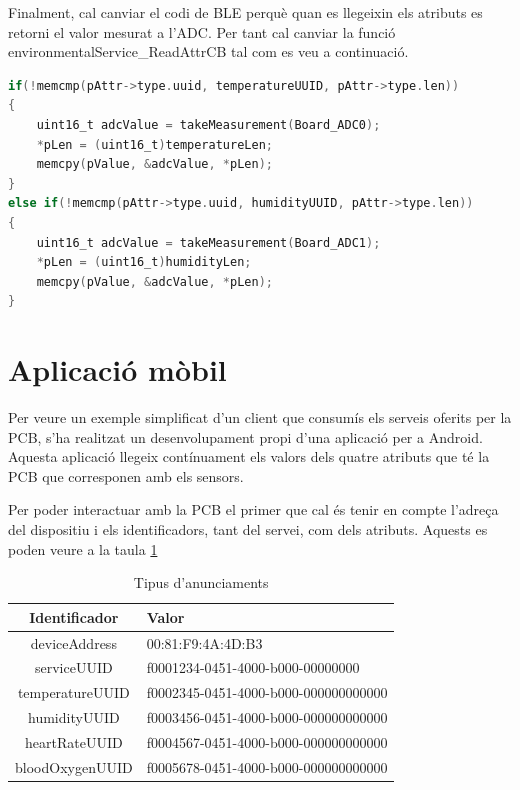 Finalment, cal canviar el codi de BLE perquè quan es llegeixin els atributs es retorni el valor mesurat a l'ADC.
Per tant cal canviar la funció environmentalService\_ReadAttrCB tal com es veu a continuació.

\begin{lstlisting}[language=C]
  if(!memcmp(pAttr->type.uuid, temperatureUUID, pAttr->type.len))
{
	uint16_t adcValue = takeMeasurement(Board_ADC0);
	*pLen = (uint16_t)temperatureLen;
	memcpy(pValue, &adcValue, *pLen);
}
else if(!memcmp(pAttr->type.uuid, humidityUUID, pAttr->type.len))
{
	uint16_t adcValue = takeMeasurement(Board_ADC1);
	*pLen = (uint16_t)humidityLen;
	memcpy(pValue, &adcValue, *pLen);
}
\end{lstlisting}


\section{Aplicació mòbil}
Per veure un exemple simplificat d'un client que consumís els serveis oferits per la PCB, s'ha realitzat un desenvolupament propi d'una aplicació per a Android.
Aquesta aplicació llegeix contínuament els valors dels quatre atributs que té la PCB que corresponen amb els sensors.

Per poder interactuar amb la PCB el primer que cal és tenir en compte l'adreça del dispositiu i els identificadors, tant del servei, com dels atributs.
Aquests es poden veure a la taula \ref{taula_app}

\begin{table}[!h]
	\begin{center}
		\begin{tabular}{|c|l|}
			\hline
			Identificador	&	Valor	\\	\hline
			deviceAddress	&	00:81:F9:4A:4D:B3	\\	\hline
			serviceUUID		&	f0001234-0451-4000-b000-00000000		\\	\hline
			temperatureUUID	&	f0002345-0451-4000-b000-000000000000	\\	\hline
			humidityUUID	&	f0003456-0451-4000-b000-000000000000	\\	\hline
			heartRateUUID	&	f0004567-0451-4000-b000-000000000000	\\	\hline
			bloodOxygenUUID	&	f0005678-0451-4000-b000-000000000000	\\	\hline
		\end{tabular}
		\label{taula_app}
	\end{center}
	\caption{Tipus d'anunciaments}
\end{table}

